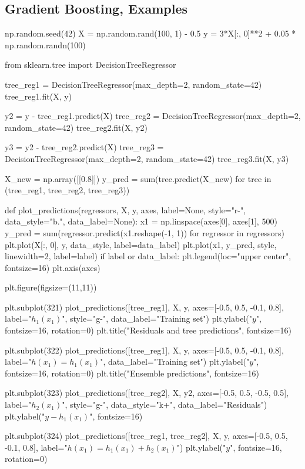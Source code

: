 \documentclass[%
oneside,                 %
final,                   %
10pt]{article}
\begin{document}
\noindent
\subsection{Gradient Boosting, Examples}
\bpycod
np.random.seed(42)
X = np.random.rand(100, 1) - 0.5
y = 3*X[:, 0]**2 + 0.05 * np.random.randn(100)

from sklearn.tree import DecisionTreeRegressor

tree_reg1 = DecisionTreeRegressor(max_depth=2, random_state=42)
tree_reg1.fit(X, y)

y2 = y - tree_reg1.predict(X)
tree_reg2 = DecisionTreeRegressor(max_depth=2, random_state=42)
tree_reg2.fit(X, y2)

y3 = y2 - tree_reg2.predict(X)
tree_reg3 = DecisionTreeRegressor(max_depth=2, random_state=42)
tree_reg3.fit(X, y3)

X_new = np.array([[0.8]])
y_pred = sum(tree.predict(X_new) for tree in (tree_reg1, tree_reg2, tree_reg3))

def plot_predictions(regressors, X, y, axes, label=None, style="r-", data_style="b.", data_label=None):
    x1 = np.linspace(axes[0], axes[1], 500)
    y_pred = sum(regressor.predict(x1.reshape(-1, 1)) for regressor in regressors)
    plt.plot(X[:, 0], y, data_style, label=data_label)
    plt.plot(x1, y_pred, style, linewidth=2, label=label)
    if label or data_label:
        plt.legend(loc="upper center", fontsize=16)
    plt.axis(axes)

plt.figure(figsize=(11,11))

plt.subplot(321)
plot_predictions([tree_reg1], X, y, axes=[-0.5, 0.5, -0.1, 0.8], label="$h_1(x_1)$", style="g-", data_label="Training set")
plt.ylabel("$y$", fontsize=16, rotation=0)
plt.title("Residuals and tree predictions", fontsize=16)

plt.subplot(322)
plot_predictions([tree_reg1], X, y, axes=[-0.5, 0.5, -0.1, 0.8], label="$h(x_1) = h_1(x_1)$", data_label="Training set")
plt.ylabel("$y$", fontsize=16, rotation=0)
plt.title("Ensemble predictions", fontsize=16)

plt.subplot(323)
plot_predictions([tree_reg2], X, y2, axes=[-0.5, 0.5, -0.5, 0.5], label="$h_2(x_1)$", style="g-", data_style="k+", data_label="Residuals")
plt.ylabel("$y - h_1(x_1)$", fontsize=16)

plt.subplot(324)
plot_predictions([tree_reg1, tree_reg2], X, y, axes=[-0.5, 0.5, -0.1, 0.8], label="$h(x_1) = h_1(x_1) + h_2(x_1)$")
plt.ylabel("$y$", fontsize=16, rotation=0)
\end{document}
